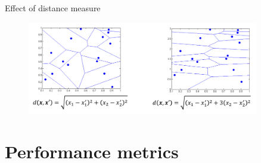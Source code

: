 \documentclass[serif, aspectratio=169]{beamer}
\begin{document}
\begin{frame}{Effect of distance measure}
    \begin{figure}[h]
            \centering
            
            \includegraphics[width=0.9\textwidth]{pic/DistMeasEf.png}
            \end{figure}
\end{frame}
\section{Performance metrics}
\end{document}
